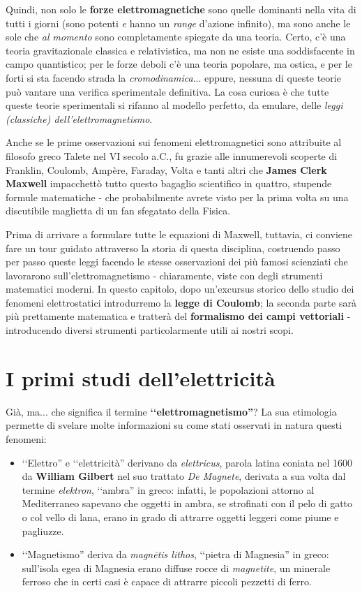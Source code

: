Quindi, non solo le \textbf{forze elettromagnetiche} sono quelle dominanti nella vita di tutti i giorni (sono potenti \textit{e} hanno un \textit{range} d'azione infinito), ma sono anche le sole che \textit{al momento} sono completamente spiegate da una teoria. Certo, c'è una teoria gravitazionale classica e relativistica, ma non ne esiste una soddisfacente in campo quantistico; per le forze deboli c'è una teoria popolare, ma ostica, e per le forti si sta facendo strada la \textit{cromodinamica}... eppure, nessuna di queste teorie può vantare una verifica sperimentale definitiva. La cosa curiosa è che tutte queste teorie sperimentali si rifanno al modello perfetto, da emulare, delle \textit{leggi (classiche) dell'elettromagnetismo}.

Anche se le prime osservazioni sui fenomeni elettromagnetici sono attribuite al filosofo greco Talete nel VI secolo a.C., fu grazie alle innumerevoli scoperte di Franklin, Coulomb, Ampère, Faraday, Volta e tanti altri che \textbf{James Clerk Maxwell} impacchettò tutto questo bagaglio scientifico in quattro, stupende formule matematiche - che probabilmente avrete visto per la prima volta su una discutibile maglietta di un fan sfegatato della Fisica.

Prima di arrivare a formulare tutte le equazioni di Maxwell, tuttavia, ci conviene fare un tour guidato attraverso la storia di questa disciplina, costruendo passo per passo queste leggi facendo le stesse osservazioni dei più famosi scienziati che lavorarono sull'elettromagnetismo - chiaramente, viste con degli strumenti matematici moderni. In questo capitolo, dopo un'excursus storico dello studio dei fenomeni elettrostatici introdurremo la \textbf{legge di Coulomb}; la seconda parte sarà più prettamente matematica e tratterà del \textbf{formalismo dei campi vettoriali} - introducendo diversi strumenti particolarmente utili ai nostri scopi.
\section{I primi studi dell'elettricità}
Già, ma... che significa il termine \textbf{‘‘elettromagnetismo''}? La sua etimologia permette di svelare molte informazioni su come stati osservati in natura questi fenomeni:
\begin{itemize}
	\item ‘‘Elettro'' e ‘‘elettricità'' derivano da \textit{elettricus}, parola latina coniata nel 1600 da \textbf{William Gilbert} nel suo trattato \textit{De Magnete}, derivata a sua volta dal termine \textit{elektron}, ‘‘ambra'' in greco: infatti, le popolazioni attorno al Mediterraneo sapevano che oggetti in ambra, se strofinati con il pelo di gatto o col vello di lana, erano in grado di attrarre oggetti leggeri come piume e pagliuzze.
	\item ‘‘Magnetismo'' deriva da \textit{magnētis lithos}, ‘‘pietra di Magnesia'' in greco: sull'isola egea di Magnesia erano diffuse rocce di \textit{magnetite}, un minerale ferroso che in certi casi è capace di attrarre piccoli pezzetti di ferro.
\end{itemize}
